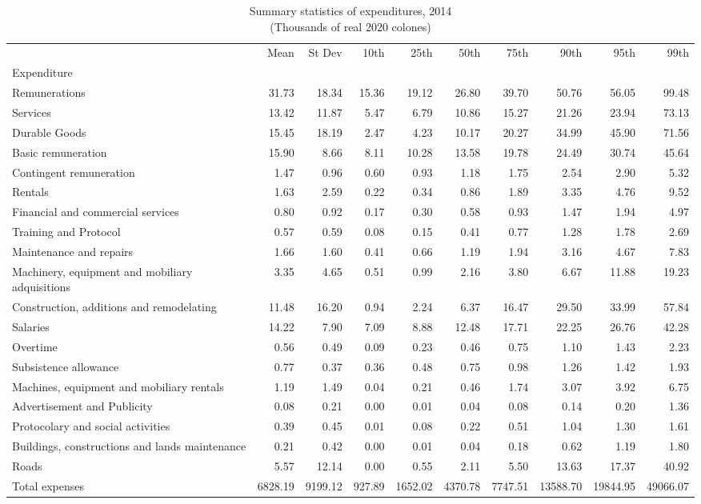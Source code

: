 \begin{table}[h]
\centering
\caption{Summary statistics of expenditures, 2014\\(Thousands of real 2020 colones)}
\begin{tabular}{lrrrrrrrrr}
\toprule
 & Mean & St Dev & 10th & 25th & 50th & 75th & 90th & 95th & 99th \\
Expenditure &  &  &  &  &  &  &  &  &  \\
\midrule
Remunerations & 31.73 & 18.34 & 15.36 & 19.12 & 26.80 & 39.70 & 50.76 & 56.05 & 99.48 \\
Services & 13.42 & 11.87 & 5.47 & 6.79 & 10.86 & 15.27 & 21.26 & 23.94 & 73.13 \\
Durable Goods & 15.45 & 18.19 & 2.47 & 4.23 & 10.17 & 20.27 & 34.99 & 45.90 & 71.56 \\
Basic remuneration & 15.90 & 8.66 & 8.11 & 10.28 & 13.58 & 19.78 & 24.49 & 30.74 & 45.64 \\
Contingent remuneration & 1.47 & 0.96 & 0.60 & 0.93 & 1.18 & 1.75 & 2.54 & 2.90 & 5.32 \\
Rentals & 1.63 & 2.59 & 0.22 & 0.34 & 0.86 & 1.89 & 3.35 & 4.76 & 9.52 \\
Financial and commercial services & 0.80 & 0.92 & 0.17 & 0.30 & 0.58 & 0.93 & 1.47 & 1.94 & 4.97 \\
Training and Protocol & 0.57 & 0.59 & 0.08 & 0.15 & 0.41 & 0.77 & 1.28 & 1.78 & 2.69 \\
Maintenance and repairs & 1.66 & 1.60 & 0.41 & 0.66 & 1.19 & 1.94 & 3.16 & 4.67 & 7.83 \\
Machinery, equipment and mobiliary adquisitions & 3.35 & 4.65 & 0.51 & 0.99 & 2.16 & 3.80 & 6.67 & 11.88 & 19.23 \\
Construction, additions and remodelating & 11.48 & 16.20 & 0.94 & 2.24 & 6.37 & 16.47 & 29.50 & 33.99 & 57.84 \\
Salaries & 14.22 & 7.90 & 7.09 & 8.88 & 12.48 & 17.71 & 22.25 & 26.76 & 42.28 \\
Overtime & 0.56 & 0.49 & 0.09 & 0.23 & 0.46 & 0.75 & 1.10 & 1.43 & 2.23 \\
Subsistence allowance & 0.77 & 0.37 & 0.36 & 0.48 & 0.75 & 0.98 & 1.26 & 1.42 & 1.93 \\
Machines, equipment and mobiliary rentals & 1.19 & 1.49 & 0.04 & 0.21 & 0.46 & 1.74 & 3.07 & 3.92 & 6.75 \\
Advertisement and Publicity & 0.08 & 0.21 & 0.00 & 0.01 & 0.04 & 0.08 & 0.14 & 0.20 & 1.36 \\
Protocolary and social activities & 0.39 & 0.45 & 0.01 & 0.08 & 0.22 & 0.51 & 1.04 & 1.30 & 1.61 \\
Buildings, constructions and lands maintenance & 0.21 & 0.42 & 0.00 & 0.01 & 0.04 & 0.18 & 0.62 & 1.19 & 1.80 \\
Roads & 5.57 & 12.14 & 0.00 & 0.55 & 2.11 & 5.50 & 13.63 & 17.37 & 40.92 \\
Total expenses & 6828.19 & 9199.12 & 927.89 & 1652.02 & 4370.78 & 7747.51 & 13588.70 & 19844.95 & 49066.07 \\
\bottomrule
\end{tabular}
\end{table}
